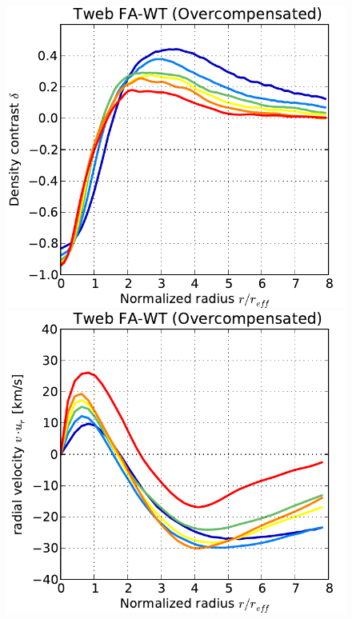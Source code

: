 \documentclass[a4,useAMS,usenatbib,usegraphicx]{latex/mn2e}
\begin{document}
\begin{figure}
  \includegraphics[trim = 1mm 0mm 5mm 0mm, clip, keepaspectratio=true,
  width=0.24\textheight]{./figures/voids_density_TwebFAG1.pdf}
  \includegraphics[trim = 1mm 0mm 5mm 0mm, clip, keepaspectratio=true,
  width=0.24\textheight]{./figures/voids_velocity_TwebFAG1.pdf}

\end{figure}
\end{document}
